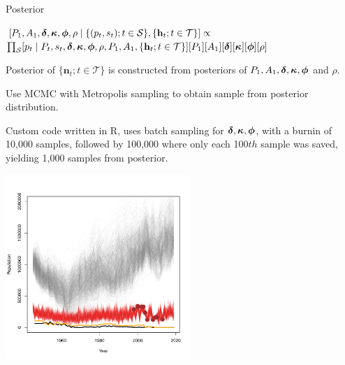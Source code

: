 \documentclass[mathserif,compress]{beamer}
\def\bh{\mathbf{h}}
\def\bn{\mathbf{n}}
\def\bdelta{\mbox{\boldmath $\delta$}}
\def\bphi{\mbox{\boldmath $\phi$}}
\def\bkappa{\mbox{\boldmath $\kappa$}}
\begin{document}
\begin{frame} 

Posterior
\begin{center}
$[P_{1},A_{1},\bdelta,\bkappa,\bphi,\rho \mid \{(p_{t},s_{t}); t \in \mathcal{S}\},\{\bh_{t}; t \in \mathcal{T}\}] \propto$ \\
$\prod_{\mathcal{S}}[p_{t} \mid P_{t}, s_{t},\bdelta,\bkappa,\bphi,\rho,P_{1},A_{1},\{\bh_{t}; t \in \mathcal{T}\}][P_{1}][A_{1}][\bdelta][\bkappa][\bphi][\rho]${}
\end{center}

Posterior of $\{\bn_{t}; t \in \mathcal{T}\}$ is constructed from posteriors of $P_{1},A_{1},\bdelta,\bkappa,\bphi$ and $\rho$. 

\vspace{.2cm}
Use MCMC with Metropolis sampling to obtain sample from posterior distribution.

\vspace{.2cm}
Custom code written in R, uses batch sampling for $\bdelta,\bkappa,\bphi$, with a burnin of 10,000 samples, followed by 100,000 where only each 100$th$ sample was saved, yielding 1,000 samples from posterior. 
\end{frame}




\begin{frame} 

\begin{center}
	\includegraphics[height=7cm]{figure/Pop_traj} 
\end{center}
\end{frame}
\end{document}
